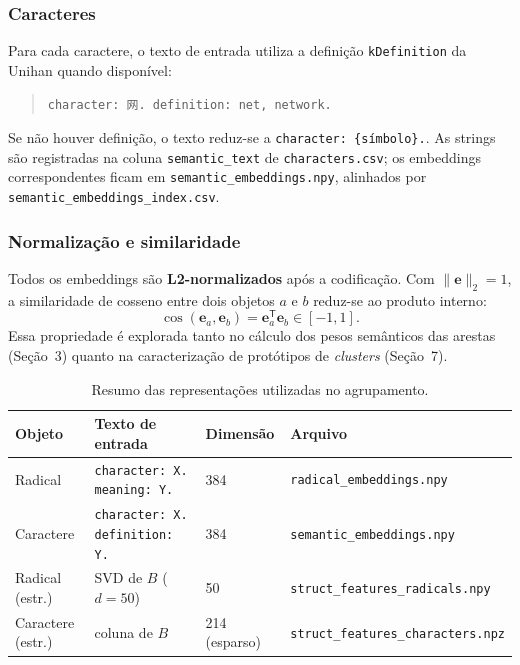 \documentclass[10pt, a4paper, titlepage]{extarticle}
\begin{document}
\subsubsection{Caracteres}
Para cada caractere, o texto de entrada utiliza a definição \texttt{kDefinition} da Unihan quando disponível:
\begin{quote}
\texttt{character: 网. definition: net, network.}
\end{quote}
Se não houver definição, o texto reduz-se a \texttt{character: \{símbolo\}.}. As strings são registradas na coluna \texttt{semantic\_text} de \texttt{characters.csv}; os embeddings correspondentes ficam em \texttt{semantic\_embeddings.npy}, alinhados por \texttt{semantic\_embeddings\_index.csv}.

\subsubsection{Normalização e similaridade}
Todos os embeddings são \textbf{L2-normalizados} após a codificação. Com $\|\mathbf{e}\|_2 = 1$, a similaridade de cosseno entre dois objetos $a$ e $b$ reduz-se ao produto interno:
\[
\cos(\mathbf{e}_a, \mathbf{e}_b) = \mathbf{e}_a^{\mathsf{T}} \mathbf{e}_b \in [-1, 1].
\]
Essa propriedade é explorada tanto no cálculo dos pesos semânticos das arestas (Seção~3) quanto na caracterização de protótipos de \emph{clusters} (Seção~7).
\begin{table}[H]
\centering
\small
\renewcommand{\arraystretch}{1.2}
\begin{tabular}{p{2.2cm} p{3.8cm} p{3.2cm} p{3.8cm}}
\toprule
\textbf{Objeto} & \textbf{Texto de entrada} & \textbf{Dimensão} & \textbf{Arquivo} \\
\midrule
Radical &
\texttt{character: X. meaning: Y.} &
384 &
\texttt{radical\_embeddings.npy} \\
Caractere &
\texttt{character: X. definition: Y.} &
384 &
\texttt{semantic\_embeddings.npy} \\
Radical (estr.) &
SVD de $B$ ($d=50$) &
50 &
\texttt{struct\_features\_radicals.npy} \\
Caractere (estr.) &
coluna de $B$ &
214 (esparso) &
\texttt{struct\_features\_characters.npz} \\
\bottomrule
\end{tabular}
\caption{Resumo das representações utilizadas no agrupamento.}
\label{tab:representacoes}
\end{table}
\end{document}
